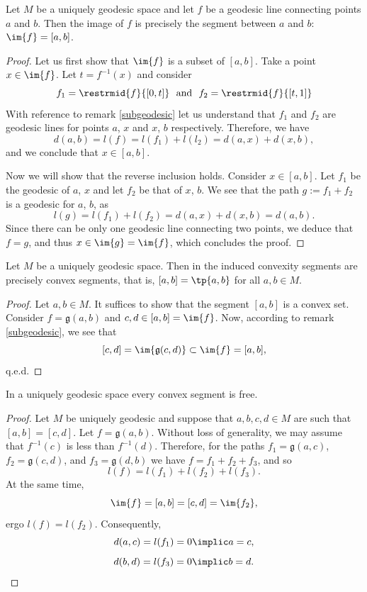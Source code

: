 \documentclass[12pt, a4paper]{article}
\newcommand{\g}{\mathfrak{g}}
\begin{document}
\begin{lemma}\label{unigeo-1}
    Let \(M\) be a uniquely geodesic space and let \(f\) be a geodesic line connecting points \(a\) and \(b\). Then the image of \(f\) is precisely the segment between \(a\) and \(b\): \(\im{f} = [a, b]\).
\end{lemma}
\begin{proof}
    Let us first show that \(\im{f}\) is a subset of \([a, b]\). Take a point \(x \in \im{f}\). Let \(t = f^{-1}(x)\) and consider \[f_1 = \restrmid{f}{[0, t]} \ \mbox{    and    } \ f_2 = \restrmid{f}{[t, 1]}\] With reference to remark \ref{subgeodesic} let us understand that \(f_1\) and \(f_2\) are geodesic lines for points \(a\), \(x\) and \(x\), \(b\) respectively. Therefore, we have \[d(a, b) = l(f) = l(f_1) + l(l_2) = d(a, x) + d(x, b),\] and we conclude that \(x \in [a, b]\).

    Now we will show that the reverse inclusion holds. Consider \(x \in [a, b]\). Let \(f_1\) be the geodesic of \(a\), \(x\) and let \(f_2\) be that of \(x\), \(b\). We see that the path \(g := f_1+f_2\) is a geodesic for \(a\), \(b\), as \[l(g) = l(f_1) + l(f_2) = d(a, x) + d(x, b) = d(a, b).\] Since there can be only one geodesic line connecting two points, we deduce that \(f = g\), and thus \(x \in \im{g} = \im{f}\), which concludes the proof.
\end{proof}

\begin{lemma}\label{unigeo-2}
    Let \(M\) be a uniquely geodesic space. Then in the induced convexity segments are precisely convex segments, that is, \([a, b] = \tp{a, b}\) for all \(a, b \in M\).
\end{lemma}
\begin{proof}
    Let \(a, b \in M\). It suffices to show that the segment \([a, b]\) is a convex set. Consider \(f = \g(a,b)\) and \(c, d \in [a, b] = \im{f}\). Now, according to remark \ref{subgeodesic}, we see that \[[c, d] = \im{\g(c, d)} \subset \im{f} = [a, b],\] q.e.d.
\end{proof}

\begin{lemma}\label{unigeo-3}
    In a uniquely geodesic space every convex segment is free.
\end{lemma}
\begin{proof}
    Let \(M\) be uniquely geodesic and suppose that \(a, b, c, d \in M\) are such that \([a, b] = [c, d]\). Let \(f = \g(a, b)\). Without loss of generality, we may assume that \(f^{-1}(c)\) is less than \(f^{-1}(d)\). Therefore, for the paths \(f_1 = \g(a, c)\), \(f_2 = \g(c, d)\), and \(f_3 = \g(d, b)\) we have \(f = f_1 + f_2 + f_3\), and so \[l(f) = l(f_1) + l(f_2) + l(f_3).\] At the same time, \[\im{f} = [a, b] = [c, d] = \im{f_2},\] ergo \(l(f) = l(f_2)\). Consequently, \[d(a, c) = l(f_1) = 0 \implic a = c,\] \[d(b, d) = l(f_3) = 0 \implic b = d.\] 
\end{proof}
\end{document}
